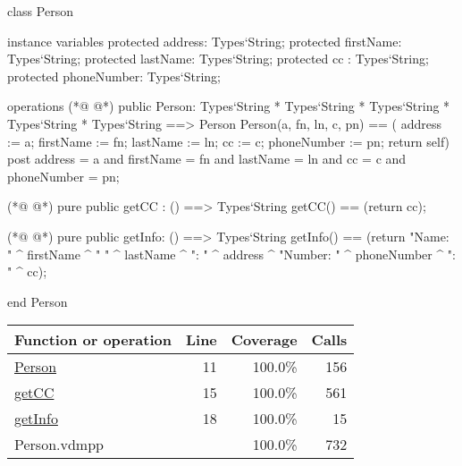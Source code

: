 \begin{vdmpp}[breaklines=true]
class Person

instance variables
  protected address: Types`String;
  protected firstName: Types`String;
  protected lastName: Types`String;
  protected cc : Types`String;
  protected phoneNumber: Types`String;
  
operations
(*@
\label{Person:11}
@*)
 public Person: Types`String * Types`String * Types`String * Types`String * Types`String ==> Person
  Person(a, fn, ln, c, pn) == ( address := a; firstName := fn; lastName := ln; cc := c; phoneNumber := pn; return self)
 post address = a and firstName = fn and lastName = ln and cc = c and phoneNumber = pn;
  
(*@
\label{getCC:15}
@*)
 pure public getCC : () ==> Types`String
  getCC() == (return cc);
  
(*@
\label{getInfo:18}
@*)
 pure public getInfo: () ==> Types`String
  getInfo() == (return "Name: " ^ firstName ^ " " ^ lastName ^ "\nAddress: " ^ address ^ "\nPhone Number: " ^ phoneNumber ^ "\nCC: " ^ cc);

end Person
\end{vdmpp}
\bigskip
\begin{longtable}{|l|r|r|r|}
\hline
Function or operation & Line & Coverage & Calls \\
\hline
\hline
\hyperref[Person:11]{Person} & 11&100.0\% & 156 \\
\hline
\hyperref[getCC:15]{getCC} & 15&100.0\% & 561 \\
\hline
\hyperref[getInfo:18]{getInfo} & 18&100.0\% & 15 \\
\hline
\hline
Person.vdmpp & & 100.0\% & 732 \\
\hline
\end{longtable}


